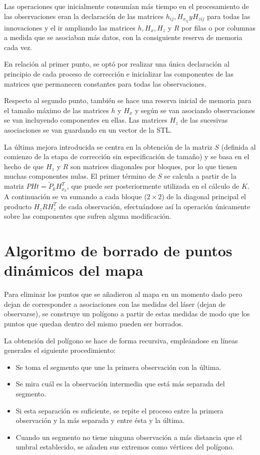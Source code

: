 Las operaciones que inicialmente consumían más tiempo en el procesamiento de las observaciones eran la declaración de las matrices $h_{ij}, H_{x_{ij}} y H_{z{ij}}$ para todas las innovaciones y el ir ampliando las matrices $h, H_{x}, H_{z}$ y $R$ por filas o por columnas a medida que se asociaban más datos, con la consiguiente reserva de memoria cada vez.

En relación al primer punto, se optó por realizar una única declaración al principio de cada proceso de corrección e inicializar las componentes de las matrices que permanecen constantes para todas las observaciones.

Respecto al segundo punto, también se hace una reserva inicial de memoria para el tamaño máximo de las matrices $h$ y $H_{x}$ y según se van asociando observaciones se van incluyendo componentes en ellas. Las matrices $H_{z}$ de las sucesivas asociaciones se van guardando en un vector de la STL.

La última mejora introducida se centra en la obtención de la matriz $S$ (definida al comienzo de la etapa de corrección sin especificación de tamaño) y se basa en el hecho de que $H_{z}$ y $R$ son matrices diagonales por bloques, por lo que tienen muchas componentes nulas. El primer término de $S$ se calcula a partir de la matriz $PHt = \tilde{P}_{k}H_{x_{k}}^{T}$, que puede ser posteriormente utilizada en el cálculo de $K$. A continuación se va sumando a cada bloque ($2 \times 2$) de la diagonal principal el producto $H_{z}RH_{z}^{T}$ de cada observación, efectuándose así la operación únicamente sobre las componentes que sufren alguna modificación.

\section{Algoritmo de borrado de puntos \\dinámicos del mapa} \label{poligono}
Para eliminar los puntos que se añadieron al mapa en un momento dado pero dejan de corresponder a asociaciones con las medidas del láser (dejan de observarse), se construye un polígono a partir de estas medidas de modo que los puntos que quedan dentro del mismo pueden ser borrados.

La obtención del polígono se hace de forma recursiva, empleándose en líneas generales el siguiente procedimiento:
\begin{itemize}
  \item Se toma el segmento que une la primera observación con la última.
  \item Se mira cuál es la observación intermedia que está más separada del segmento.
  \item Si esta separación es suficiente, se repite el proceso entre la primera observación y la más separada y entre ésta y la última.
  \item Cuando un segmento no tiene ninguna observación a más distancia que el umbral establecido, se añaden sus extremos como vértices del polígono.
\end{itemize}

